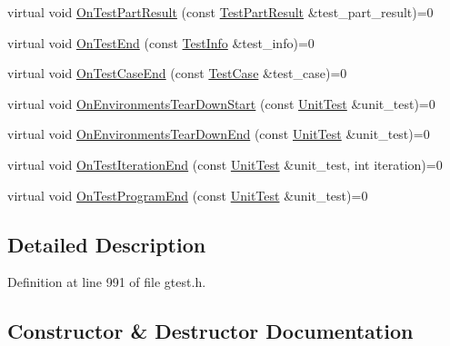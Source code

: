 \begin{DoxyCompactItemize}
virtual void \hyperlink{classtesting_1_1_test_event_listener_a054f8705c883fa120b91473aff38f2ee}{On\+Test\+Part\+Result} (const \hyperlink{classtesting_1_1_test_part_result}{Test\+Part\+Result} \&test\+\_\+part\+\_\+result)=0
\item 
virtual void \hyperlink{classtesting_1_1_test_event_listener_abb1c44525ef038500608b5dc2f17099b}{On\+Test\+End} (const \hyperlink{classtesting_1_1_test_info}{Test\+Info} \&test\+\_\+info)=0
\item 
virtual void \hyperlink{classtesting_1_1_test_event_listener_ae61985e2ef76ac78379b077be57a9c36}{On\+Test\+Case\+End} (const \hyperlink{classtesting_1_1_test_case}{Test\+Case} \&test\+\_\+case)=0
\item 
virtual void \hyperlink{classtesting_1_1_test_event_listener_a468b5e6701bcb86cb2c956caadbba5e4}{On\+Environments\+Tear\+Down\+Start} (const \hyperlink{classtesting_1_1_unit_test}{Unit\+Test} \&unit\+\_\+test)=0
\item 
virtual void \hyperlink{classtesting_1_1_test_event_listener_a9ea04fa7f447865ba76df35e12ba2092}{On\+Environments\+Tear\+Down\+End} (const \hyperlink{classtesting_1_1_unit_test}{Unit\+Test} \&unit\+\_\+test)=0
\item 
virtual void \hyperlink{classtesting_1_1_test_event_listener_a550fdb3e55726e4cefa09f5697941425}{On\+Test\+Iteration\+End} (const \hyperlink{classtesting_1_1_unit_test}{Unit\+Test} \&unit\+\_\+test, int iteration)=0
\item 
virtual void \hyperlink{classtesting_1_1_test_event_listener_ad15b6246d94c268e233487a86463ef3d}{On\+Test\+Program\+End} (const \hyperlink{classtesting_1_1_unit_test}{Unit\+Test} \&unit\+\_\+test)=0
\end{DoxyCompactItemize}


\subsection{Detailed Description}


Definition at line 991 of file gtest.\+h.



\subsection{Constructor \& Destructor Documentation}
